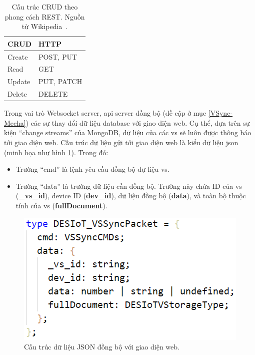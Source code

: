 \begin{table}[htp]
\caption{Cấu trúc CRUD theo phong cách REST. Nguồn từ Wikipedia~\cite{CRUD-REST-Service}.}

\label{tab:CRUD-REST-service}%
\begin{center}
\begin{tabular}{|l|l|}
\hline
\textbf{CRUD} & \textbf{HTTP} \\ \hline
Create        & POST, PUT     \\ \hline
Read          & GET           \\ \hline
Update        & PUT, PATCH    \\ \hline
Delete        & DELETE        \\ \hline
\end{tabular}
\end{center}
\end{table}

Trong vai trò Websocket server, \acrshort{api} server đồng bộ (đề cập ở mục \ref{VSync-Mecha}) các sự thay đổi dữ liệu database với giao diện web. Cụ thể, dựa trên sự kiện ``change streams'' của MongoDB, dữ liệu của các \acrshort{vs} sẽ luôn được thông báo tới giao diện web. Cấu trúc dữ liệu gửi tới giao diện web là kiểu dữ liệu \acrfull{json} (minh họa như hình \ref{fig:VSSync-JSON-model}). Trong đó:

\begin{itemize}
    \item Trường ``cmd'' là lệnh yêu cầu đồng bộ dự liệu \acrshort{vs}.
    \item Trường ``data'' là trường dữ liệu cần đồng bộ. Trường này chứa ID của \acrshort{vs} (\textbf{\_vs\_id}), device ID (\textbf{dev\_id}), dữ liệu đồng bộ (\textbf{data}), và toàn bộ thuộc tính của \acrshort{vs} (\textbf{fullDocument}).
\end{itemize}

\begin{figure}[htp]
\centering
\includegraphics[width=0.5\linewidth,frame]{images/fig-Hardware-data-frame-struct.png}
\caption{Cấu trúc dữ liệu JSON đồng bộ với giao diện web.}
\label{fig:VSSync-JSON-model}
\end{figure}

